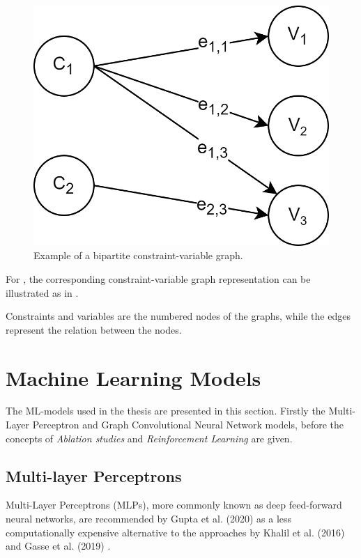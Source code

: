 \begin{figure}
    \centering
    \includegraphics[width=0.40\linewidth]{img/bipartite_zoom.png}
    \caption{Example of a bipartite constraint-variable graph.}
    \label{fig:bipartite_cv}
\end{figure}

For , the corresponding constraint-variable graph representation can be illustrated as in
.

Constraints and variables are the numbered nodes of the graphs, while the edges represent the relation between the nodes. 



\section{Machine Learning Models}


The \gls{ML}-models used in the thesis are presented in this section. Firstly the Multi-Layer Perceptron and Graph Convolutional Neural Network models, before the concepts of \textit{Ablation studies} and \textit{Reinforcement Learning} are given.

\subsection{Multi-layer Perceptrons}

Multi-Layer Perceptrons (\gls{MLP}s), more commonly known as deep feed-forward neural networks, are recommended by Gupta et al. (2020) \cite{gupta2020hybrid} as a less computationally expensive alternative to the approaches by Khalil et al. (2016) \cite{khalil2016learning} and Gasse et al. (2019) \cite{gasse2019exact}. 

